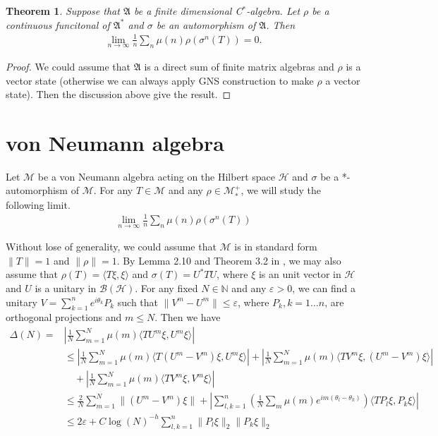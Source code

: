 \documentclass[a4paper,10pt]{amsart}
\newtheorem{theorem}{Theorem}[section]
\newcommand{\AAA}{\mathfrak A}
\newcommand{\BBB}{\mathcal B}
\newcommand{\HHH}{\mathcal H} %
\newcommand{\MMM}{\mathcal M}
\newcommand{\N}{\mathbb N} %
\begin{document}
\begin{theorem}
    Suppose that $\AAA$ be a finite dimensional C$^{*}$-algebra. Let $\rho$ be a 
    continuous funcitonal of $\AAA^{*}$ and $\sigma$
    be an automorphism of $\AAA$. Then
    \begin{align*}
        \lim_{n \rightarrow \infty}\frac{1}{n}\sum_{n}\mu(n)\rho(\sigma^{n}(T)) = 0.
    \end{align*}
\end{theorem}

\begin{proof}
   We could assume that $\AAA$ is a direct sum of finite matrix algebras and $\rho$
   is a vector state (otherwise we can always apply GNS construction to make $\rho$
   a vector state). Then the discussion above give the result.
\end{proof}


\section{von Neumann algebra}

Let $\MMM$ be a von Neumann algebra acting on the Hilbert space $\HHH$
and $\sigma$ be a *-automorphism
of $\MMM$. For any $T \in \MMM$ and any $\rho \in \MMM_{*}^{+}$, we will study the 
following limit.
\begin{align}
  \lim_{n \rightarrow \infty}\frac{1}{n}\sum_{n}\mu(n)\rho(\sigma^{n}(T)) 
\end{align}

Without lose of generality, we could assume that $\MMM$ is in standard form
$\| T \| = 1$ and $\| \rho \| = 1$.
By Lemma 2.10 and Theorem 3.2 in \cite{UH}, we may also assume that 
$\rho(T) = \langle T\xi, \xi \rangle$ and $\sigma(T) = U^{*}TU$, 
where $\xi$ is an unit vector 
in $\HHH$ and $U$ is a unitary in $\BBB(\HHH)$.
For any fixed $N \in \N$ and any $\varepsilon > 0$, we can find a unitary
$V = \sum_{k=1}^{n} e^{i\theta_{k}}P_{k}$ such that $\| V^{m} - U^{m} \|
\leq \varepsilon$, where $P_k, k=1 \ldots n$, are orthogonal projections and
$m \leq N$. Then we have
\begin{align*}
    \Delta(N) = 
  &| \frac{1}{N}\sum_{m=1}^{N}\mu(m)\langle TU^{m}\xi, U^{m}\xi \rangle | \\
  & \leq | \frac{1}{N}\sum_{m=1}^{N}\mu(m)\langle T(U^{m} - V^{m})\xi, U^{m}\xi \rangle|
    + | \frac{1}{N}\sum_{m=1}^{N}\mu(m)\langle TV^{m}\xi, (U^{m}-V^{m})\xi \rangle| \\ 
  & \quad + | \frac{1}{N}\sum_{m=1}^{N}\mu(m)\langle TV^{m}\xi, V^{m}\xi \rangle | \\
  & \leq \frac{2}{N}\sum_{m=1}^{N}\| (U^{m} - V^{m})\xi \|  
   + | \sum_{l,k=1}^{n} (\frac{1}{N}\sum_{m}\mu(m)e^{im(\theta_l - \theta_k)})
     \langle TP_{l}\xi, P_{k}\xi \rangle|\\
  & \leq 2\varepsilon +  
      C\log(N)^{-h} \sum_{l,k=1}^{n} \|P_{l}\xi\|_{2} \|P_{k}\xi \|_2 
\end{align*}
\end{document}
